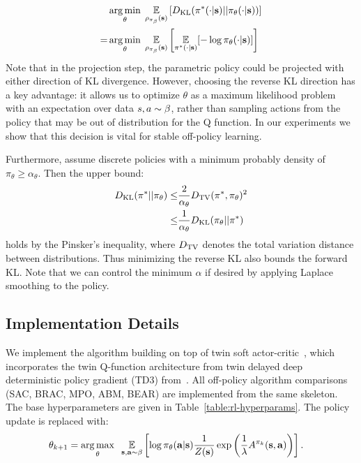 \documentclass[conference]{IEEEtran}
\begin{document}
\begin{align}
    & \operatorname*{arg\,min}_\theta \; \operatorname*{\mathbb{E}}_{\rho_{\pi_\beta}(\mathbf{s}) } \left[D_{\mathrm{KL}}(\pi^*(\cdot|\mathbf{s})||\pi_\theta(\cdot|\mathbf{s}))\right] \\ = & 
    \operatorname*{arg\,min}_\theta \; \operatorname*{\mathbb{E}}_{\rho_{\pi_\beta}(\mathbf{s})} \left[\operatorname*{\mathbb{E}}_{\pi^*(\cdot|\mathbf{s})}[-\log \pi_\theta(\cdot|\mathbf{s})]\right]
\end{align}
Note that in the projection step, the parametric policy could be projected with either direction of KL divergence. However, choosing the reverse KL direction has a key advantage: it allows us to optimize $\theta$ as a maximum likelihood problem with an expectation over data $s, a \sim \beta$, rather than sampling actions from the policy that may be out of distribution for the Q function. In our experiments we show that this decision is vital for stable off-policy learning.

Furthermore, assume discrete policies with a minimum probably density of $\pi_\theta \geq \alpha_\theta$. Then the upper bound:
\begin{align}
    D_{\mathrm{KL}}(\pi^*||\pi_\theta) \leq & \frac{2}{\alpha_\theta} D_\mathrm{TV}(\pi^*, \pi_\theta)^2 \\
    \leq & \frac{1}{\alpha_\theta} D_{\mathrm{KL}}(\pi_\theta||\pi^*)
\end{align}
holds by the Pinsker's inequality, where $D_\mathrm{TV}$ denotes the total variation distance between distributions. Thus minimizing the reverse KL also bounds the forward KL. Note that we can control the minimum $\alpha$ if desired by applying Laplace smoothing to the policy.

\subsection{Implementation Details} \label{sec:implementation}

We implement the algorithm building on top of twin soft actor-critic~\citep{haarnoja2018sac}, which incorporates the twin Q-function architecture from twin delayed deep deterministic policy gradient (TD3) from~\citet{fujimoto2018td3}. All off-policy algorithm comparisons (SAC, BRAC, MPO, ABM, BEAR) are implemented from the same skeleton. The base hyperparameters are given in Table~\ref{table:rl-hyperparams}. The policy update is replaced with:
\begin{align}
    \theta_{k+1} = \operatorname*{arg\,max}_\theta \; & \; \operatorname*{\mathbb{E}}_{\mathbf{s}, \mathbf{a} \sim \beta}
    \left[\log \pi_\theta(\mathbf{a}|\mathbf{s}) \frac{1}{Z(\mathbf{s})}  \exp \left(\frac{1}{\lambda}A^{\pi_k}(\mathbf{s}, \mathbf{a}) \right)\right].
\end{align}
\end{document}
